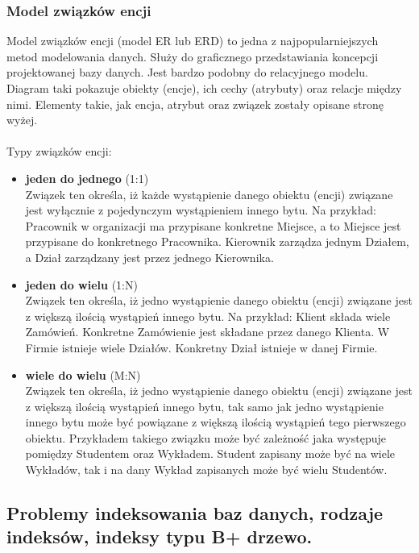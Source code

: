 \documentclass[a4paper,12pt,oneside]{book}
\begin{document}
			\newpage
			\subsubsection{Model związków encji}
			\noindent  Model związków encji (model ER lub ERD) to jedna z najpopularniejszych metod modelowania danych. Służy do graficznego przedstawiania koncepcji projektowanej bazy danych. Jest bardzo podobny do relacyjnego modelu. Diagram taki pokazuje obiekty (encje), ich cechy (atrybuty) oraz relacje między nimi. Elementy takie, jak encja, atrybut oraz związek zostały opisane stronę wyżej. \\ \\
			Typy związków encji:
			\begin{itemize}
				\itemsep 0em
				\item \textbf{jeden do jednego} (1:1) \\
				Związek ten określa, iż każde wystąpienie danego obiektu (encji) związane jest wyłącznie z pojedynczym wystąpieniem innego bytu. Na przykład: Pracownik w organizacji ma przypisane konkretne Miejsce, a to Miejsce jest przypisane do konkretnego Pracownika. Kierownik zarządza jednym Działem, a Dział zarządzany jest przez jednego Kierownika.
				\item \textbf{jeden do wielu} (1:N) \\
				Związek ten określa, iż jedno wystąpienie danego obiektu (encji) związane jest z większą ilością wystąpień innego bytu. Na przykład: Klient składa wiele Zamówień. Konkretne Zamówienie jest składane przez danego Klienta. W Firmie istnieje wiele Działów. Konkretny Dział istnieje w danej Firmie.
				\item \textbf{wiele do wielu} (M:N) \\
				Związek ten określa, iż jedno wystąpienie danego obiektu (encji) związane jest z większą ilością wystąpień innego bytu, tak samo jak jedno wystąpienie innego bytu może być powiązane z większą ilością wystąpień tego pierwszego obiektu. Przykładem takiego związku może być zależność jaka występuje pomiędzy Studentem oraz Wykładem. Student zapisany może być na wiele Wykładów, tak i na dany Wykład zapisanych może być wielu Studentów.
			\end{itemize}
			
			\newpage\subsection{Problemy indeksowania baz danych, rodzaje indeksów, indeksy typu B+ drzewo.}
\end{document}
